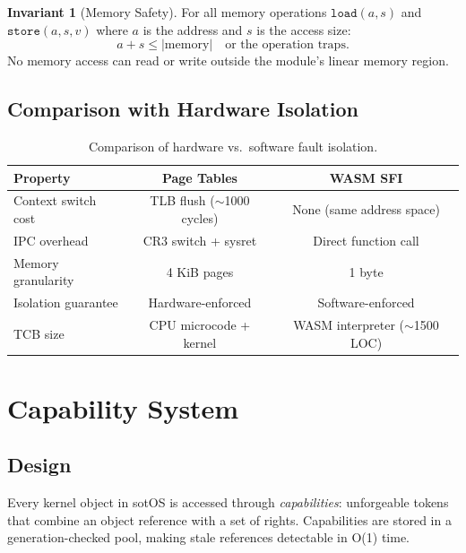 \documentclass[11pt,letterpaper]{article}
\theoremstyle{definition}
\newtheorem{invariant}{Invariant}[section]
\begin{document}
\begin{invariant}[Memory Safety]
For all memory operations $\texttt{load}(a, s)$ and $\texttt{store}(a, s, v)$
where $a$ is the address and $s$ is the access size:
\[
a + s \leq |\text{memory}| \quad \text{or the operation traps.}
\]
No memory access can read or write outside the module's linear memory region.
\end{invariant}

\subsection{Comparison with Hardware Isolation}

\begin{table}[h]
\centering
\begin{tabular}{lcc}
\toprule
\textbf{Property} & \textbf{Page Tables} & \textbf{WASM SFI} \\
\midrule
Context switch cost & TLB flush ($\sim$1000 cycles) & None (same address space) \\
IPC overhead & CR3 switch + sysret & Direct function call \\
Memory granularity & 4 KiB pages & 1 byte \\
Isolation guarantee & Hardware-enforced & Software-enforced \\
TCB size & CPU microcode + kernel & WASM interpreter ($\sim$1500 LOC) \\
\bottomrule
\end{tabular}
\caption{Comparison of hardware vs.\ software fault isolation.}
\label{tab:isolation}
\end{table}

\section{Capability System}
\label{sec:caps}

\subsection{Design}

Every kernel object in sotOS is accessed through \emph{capabilities}:
unforgeable tokens that combine an object reference with a set of rights.
Capabilities are stored in a generation-checked pool, making stale references
detectable in O(1) time.
\end{document}
